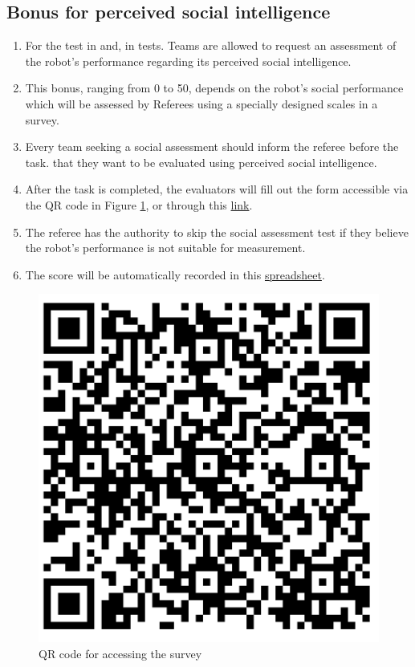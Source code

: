 \subsection{Bonus for perceived social intelligence}\label{rule:perceived_intelligence}
\begin{enumerate}	
    \item For the test  in  and,  in  tests. Teams are allowed to request an assessment of the robot's performance regarding its perceived social intelligence.
    
    \item This bonus, ranging from 0 to 50, depends on the robot's social performance which will be assessed by Referees using a specially designed scales in a survey.

    \item Every team seeking a social assessment should inform the referee before the task. that they want to be evaluated using perceived social intelligence.    
  
    \item After the task is completed, the evaluators will fill out the form accessible via the QR code in Figure \ref{fig:qr-survey}, or through this \href{https://forms.office.com/Pages/ResponsePage.aspx?id=6sSEXw03nkuDDHVvi_G1H7VNGCdGFtZJs0ryJVVWtCFUQVFSWDlYM0FHRVA2QllIT0tOQjI2QUcxQi4u}{link}.
    
    \item The referee has the authority to skip the social assessment test if they believe the robot's performance is not suitable for measurement.
    
    \item The score will be automatically recorded in this \href{https://urjc-my.sharepoint.com/:x:/r/personal/juan_pena_urjc_es/Documents/ROBOCUP%20@HOME%20PSI%20SCALE%20PROPOSAL.xlsx?d=wfdc816bee34742e1a9e5bea95677985d&csf=1&web=1&e=zRwl4u}{spreadsheet}.
\end{enumerate}

\begin{figure}[H]
    \centering    \includegraphics[width=0.3\linewidth]{images/QRCode for ROBOCUP @HOME PSI SCALE PROPOSAL(1).png}
    \caption{QR code for accessing the survey}
    \label{fig:qr-survey}
\end{figure}

